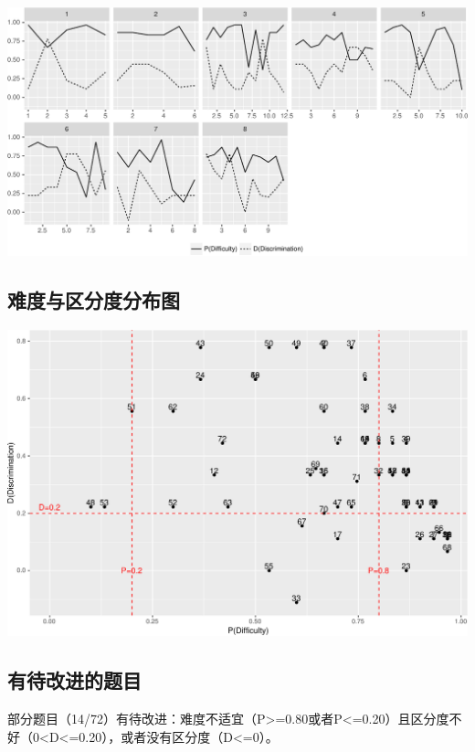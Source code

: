 \documentclass[hyperref,adobefonts]{ctexart}
\begin{document}
\includegraphics{ita_files/figure-latex/unnamed-chunk-18-1.pdf}

\subsection{难度与区分度分布图}

\includegraphics{ita_files/figure-latex/unnamed-chunk-20-1.pdf}

\subsection{有待改进的题目}

部分题目（14/72）有待改进：难度不适宜（P\textgreater{}=0.80或者P\textless{}=0.20）且区分度不好（0\textless{}D\textless{}=0.20），或者没有区分度（D\textless{}=0）。
\end{document}
